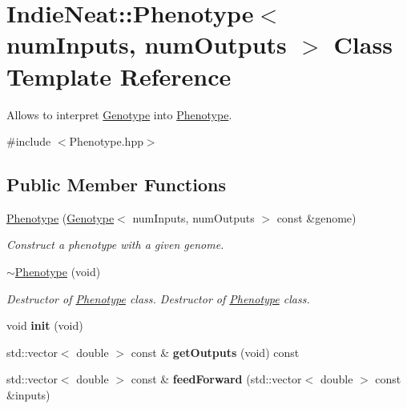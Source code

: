 \hypertarget{class_indie_neat_1_1_phenotype}{}\section{Indie\+Neat\+:\+:Phenotype$<$ num\+Inputs, num\+Outputs $>$ Class Template Reference}
\label{class_indie_neat_1_1_phenotype}


Allows to interpret \hyperlink{class_indie_neat_1_1_genotype}{Genotype} into \hyperlink{class_indie_neat_1_1_phenotype}{Phenotype}.  




{\ttfamily \#include $<$Phenotype.\+hpp$>$}

\subsection*{Public Member Functions}
\begin{DoxyCompactItemize}
\item 
\hyperlink{class_indie_neat_1_1_phenotype_a073fe9386602c8cce9dac9fc78bbce35}{Phenotype} (\hyperlink{class_indie_neat_1_1_genotype}{Genotype}$<$ num\+Inputs, num\+Outputs $>$ const \&genome)
\begin{DoxyCompactList}\small\item\em Construct a phenotype with a given genome. \end{DoxyCompactList}\item 
\mbox{\label{class_indie_neat_1_1_phenotype_a68ce3283f94cda0581322ba4fcf10ae8}} 
\hyperlink{class_indie_neat_1_1_phenotype_a68ce3283f94cda0581322ba4fcf10ae8}{$\sim$\+Phenotype} (void)
\begin{DoxyCompactList}\small\item\em Destructor of \hyperlink{class_indie_neat_1_1_phenotype}{Phenotype} class. Destructor of \hyperlink{class_indie_neat_1_1_phenotype}{Phenotype} class. \end{DoxyCompactList}\item 
\mbox{\label{class_indie_neat_1_1_phenotype_a2a8d1351b2d63539e825fa720ff9699e}} 
void {\bfseries init} (void)
\item 
\mbox{\label{class_indie_neat_1_1_phenotype_acf8ee08e9e881f33ca40f4d839a39a79}} 
std\+::vector$<$ double $>$ const  \& {\bfseries get\+Outputs} (void) const
\item 
\mbox{\label{class_indie_neat_1_1_phenotype_a8b5049674532efec31c7f4a0b742ec18}} 
std\+::vector$<$ double $>$ const  \& {\bfseries feed\+Forward} (std\+::vector$<$ double $>$ const \&inputs)
\end{DoxyCompactItemize}


